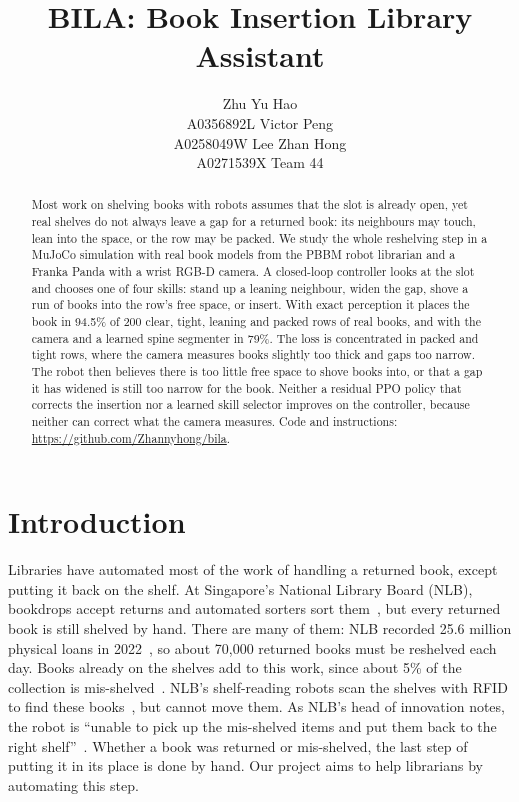 \documentclass{article}
\title{BILA: Book Insertion Library Assistant}
\author{%
  Zhu Yu Hao\\ A0356892L \And Victor Peng\\ A0258049W \And Lee Zhan Hong\\ A0271539X \AND Team 44
}
\newcommand{\coderepo}{\url{https://github.com/Zhannyhong/bila}}
\begin{document}
\maketitle

\begin{abstract}
Most work on shelving books with robots assumes that the slot is already open, yet real shelves do not always leave a
gap for a returned book: its neighbours may touch, lean into the space, or the row may be packed. We study the
whole reshelving step in a MuJoCo simulation with real book models from the PBBM robot librarian and a
Franka Panda with a wrist RGB-D camera. A closed-loop controller looks at the slot and chooses one
of four skills: stand up a leaning neighbour, widen the gap, shove a run of books into the row's free
space, or insert. With exact perception it places the book in 94.5\% of 200 clear, tight, leaning and
packed rows of real books, and with the camera and a learned spine segmenter in 79\%. The loss is concentrated in packed and tight
rows, where the camera measures books slightly too thick and gaps too narrow. The robot then believes there
is too little free space to shove books into, or that a gap it has widened is still too narrow for the book.
Neither a residual PPO policy that corrects the insertion nor a learned skill selector improves on the
controller, because neither can correct what the camera measures.
Code and instructions: \coderepo.
\end{abstract}

\section{Introduction}

Libraries have automated most of the work of handling a returned book, except putting it back on the
shelf. At Singapore's National Library Board (NLB), bookdrops accept returns and automated sorters sort
them~\citep{nlb2020robots}, but every returned book is still shelved by hand. There are many of them: NLB
recorded 25.6 million physical loans in 2022~\citep{nlb2022review}, so about 70{,}000 returned books must be
reshelved each day. Books already on the shelves add to this work, since about 5\% of the collection is
mis-shelved~\citep{liau2019robotics}. NLB's shelf-reading robots scan the shelves with RFID to find these
books~\citep{nlb2020robots}, but cannot move them. As NLB's head of innovation notes, the robot is ``unable
to pick up the mis-shelved items and put them back to the right shelf''~\citep{liau2019robotics}. Whether a
book was returned or mis-shelved, the last step of putting it in its place is done by hand. Our project aims
to help librarians by automating this step.
\end{document}
